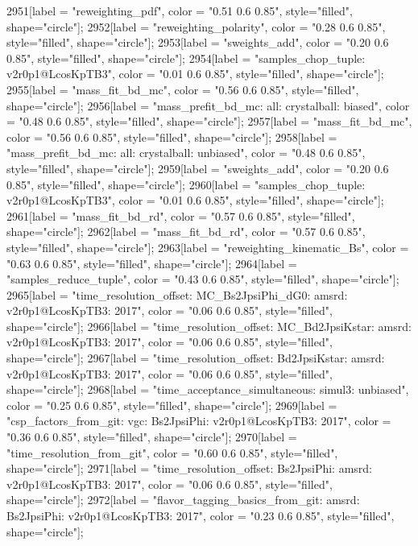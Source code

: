 {	2951[label = "reweighting_pdf", color = "0.51 0.6 0.85", style="filled", shape="circle"];
	2952[label = "reweighting_polarity", color = "0.28 0.6 0.85", style="filled", shape="circle"];
	2953[label = "sweights_add", color = "0.20 0.6 0.85", style="filled", shape="circle"];
	2954[label = "samples_chop_tuple\nversion: v2r0p1@LcosKpTB3", color = "0.01 0.6 0.85", style="filled", shape="circle"];
	2955[label = "mass_fit_bd_mc", color = "0.56 0.6 0.85", style="filled", shape="circle"];
	2956[label = "mass_prefit_bd_mc\nmassbin: all\nmassmodel: crystalball\ntrigger: biased", color = "0.48 0.6 0.85", style="filled", shape="circle"];
	2957[label = "mass_fit_bd_mc", color = "0.56 0.6 0.85", style="filled", shape="circle"];
	2958[label = "mass_prefit_bd_mc\nmassbin: all\nmassmodel: crystalball\ntrigger: unbiased", color = "0.48 0.6 0.85", style="filled", shape="circle"];
	2959[label = "sweights_add", color = "0.20 0.6 0.85", style="filled", shape="circle"];
	2960[label = "samples_chop_tuple\nversion: v2r0p1@LcosKpTB3", color = "0.01 0.6 0.85", style="filled", shape="circle"];
	2961[label = "mass_fit_bd_rd", color = "0.57 0.6 0.85", style="filled", shape="circle"];
	2962[label = "mass_fit_bd_rd", color = "0.57 0.6 0.85", style="filled", shape="circle"];
	2963[label = "reweighting_kinematic_Bs", color = "0.63 0.6 0.85", style="filled", shape="circle"];
	2964[label = "samples_reduce_tuple", color = "0.43 0.6 0.85", style="filled", shape="circle"];
	2965[label = "time_resolution_offset\nmode: MC_Bs2JpsiPhi_dG0\ntimeres: amsrd\nversion: v2r0p1@LcosKpTB3\nyear: 2017", color = "0.06 0.6 0.85", style="filled", shape="circle"];
	2966[label = "time_resolution_offset\nmode: MC_Bd2JpsiKstar\ntimeres: amsrd\nversion: v2r0p1@LcosKpTB3\nyear: 2017", color = "0.06 0.6 0.85", style="filled", shape="circle"];
	2967[label = "time_resolution_offset\nmode: Bd2JpsiKstar\ntimeres: amsrd\nversion: v2r0p1@LcosKpTB3\nyear: 2017", color = "0.06 0.6 0.85", style="filled", shape="circle"];
	2968[label = "time_acceptance_simultaneous\ntimeacc: simul3\ntrigger: unbiased", color = "0.25 0.6 0.85", style="filled", shape="circle"];
	2969[label = "csp_factors_from_git\ncsp: vgc\nmode: Bs2JpsiPhi\nversion: v2r0p1@LcosKpTB3\nyear: 2017", color = "0.36 0.6 0.85", style="filled", shape="circle"];
	2970[label = "time_resolution_from_git", color = "0.60 0.6 0.85", style="filled", shape="circle"];
	2971[label = "time_resolution_offset\nmode: Bs2JpsiPhi\ntimeres: amsrd\nversion: v2r0p1@LcosKpTB3\nyear: 2017", color = "0.06 0.6 0.85", style="filled", shape="circle"];
	2972[label = "flavor_tagging_basics_from_git\nflavor: amsrd\nmode: Bs2JpsiPhi\nversion: v2r0p1@LcosKpTB3\nyear: 2017", color = "0.23 0.6 0.85", style="filled", shape="circle"];
}
